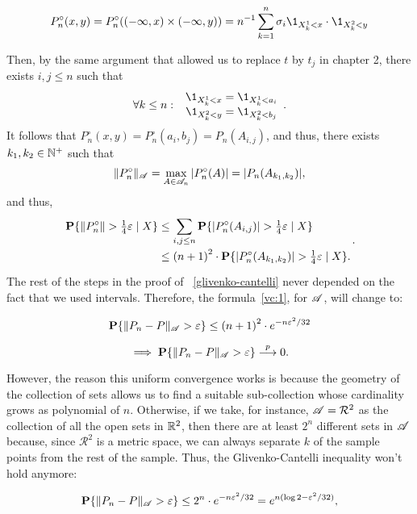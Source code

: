 \[ P_n^\circ(x,y) = P_n^\circ((-\infty, x)\times(-\infty, y)) = n^{-1} \sum_{k = 1}^{n} \sigma_i \1_{X_k^1 < x}\cdot \1_{X_k^2 < y} \] 

Then, by the same argument that allowed us to replace $t$ by $t_j$ in chapter 2, there exists $i,j\leq n$ such that
\[ \forall k \leq n:\; \begin{array}{c}
    \1_{X_k^1 < x} = \1_{X_k^1 < a_i}\\
    \1_{X_k^2 < y} = \1_{X_k^2 < b_j}
\end{array} .\] 
It follows that $P_n^\circ(x,y) = P_n^\circ(a_i,b_j) = P_n(A_{i,j})$, and thus, there exists $k_1, k_2\in \N^+$ such that
\[ \|P_n^\circ\|_\AA = \max_{A \in \AA_n}|P_n^\circ(A)| =  |P_n(A_{k_1,k_2})|, \]
and thus, 
\begin{equation} \label{vc:2}
    \everymath{\displaystyle}\arraycolsep=1.4pt\def\arraystretch{1.5}
    \begin{array}{rcl}
    \P\{ \|P_n^\circ\| > \tfrac{1}{4} \varepsilon \;|\; X \} & \leq & \sum_{i,j \leq n}\P\{ |P_n^\circ(A_{i,j})| > \tfrac{1}{4} \varepsilon \;|\; X \}\\
    & \leq & {(n+1)}^2 \cdot \P\{ |P_n^\circ(A_{k_1,k_2})| > \tfrac{1}{4} \varepsilon \;|\; X \} .
  \end{array}.
\end{equation}
The rest of the steps in the proof of ~\ref{glivenko-cantelli} never depended on the fact that we used intervals. Therefore, the formula~\ref{vc:1}, for $\AA$, will change to:

\begin{equation}
    \label{vc:3}
    \P\{\|P_n-P\|_{\AA} > \varepsilon\} \leq {(n+1)}^2 \cdot e^{-n \varepsilon^2 / 32}
\end{equation}

\[ \implies \P\{\|P_n-P\|_\AA > \varepsilon\} \overset{p}{\longrightarrow} 0.  \] 

However, the reason this uniform convergence works is because the geometry of the collection of sets allows us to find a suitable sub-collection whose cardinality grows as polynomial of $n$. Otherwise, if we take, for instance, $\AA = \mathcal{R}^2$ as the collection of all the open sets in $\R^2$, then there are at least $2^{n}$ different sets in $\AA$ because, since $\mathcal{R}^2$ is a metric space, we can always separate $k$ of the sample points from the rest of the sample. Thus, the Glivenko-Cantelli inequality won't hold anymore:

\begin{equation}
    \label{vc:4}
    \P\{\|P_n-P\|_{\AA} > \varepsilon\} \leq 2^n \cdot e^{-n \varepsilon^2 / 32} = e^{n(\log 2-\varepsilon^2/32)},
\end{equation}

